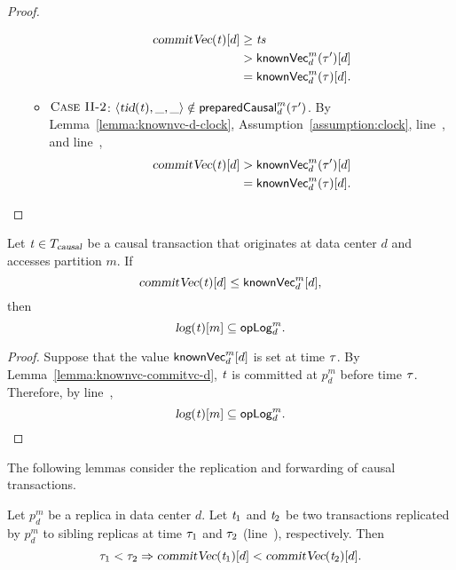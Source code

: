 \begin{proof}
\begin{itemize}
\begin{itemize}
\begin{align*}
            \textsl{commitVec}(\mathit{t})[d] &\ge \mathit{ts} \\
                              &> {\sf knownVec}^{m}_{d}(\tau')[d] \\
                              &= {\sf knownVec}^{m}_{d}(\tau)[d].
          \end{align*}
        \item $\textsc{Case II-2}$:
          $\langle \textsl{tid}(\mathit{t}), \_, \_ \rangle \notin {\sf preparedCausal}^{m}_{d}(\tau')$.
          By Lemma~\ref{lemma:knownvc-d-clock},
          Assumption~\ref{assumption:clock},
          line~\code{\ref{alg:unistore-replica}}{\ref{line:preparecausal-ts}},
          and line~\code{\ref{alg:unistore-coord}}{\ref{line:commitcausal-commitvc-d}},
          \begin{align*}
            \textsl{commitVec}(\mathit{t})[d] &> {\sf knownVec}^{m}_{d}(\tau')[d] \\
                              &= {\sf knownVec}^{m}_{d}(\tau)[d].
          \end{align*}
      \end{itemize}
  \end{itemize}
\end{proof}

\begin{applemma} \label{lemma:knownvc-local-d}
  Let $\mathit{t} \in T_{\textsl{causal}}$ be a causal transaction
  that originates at data center $d$ and accesses partition $m$.
  If
  \[
    \textsl{commitVec}(\mathit{t})[d] \le {\sf knownVec}^{m}_{d}[d],
  \]
  then
  \[
    \textsl{log}(\mathit{t})[m] \subseteq {\sf opLog}^{m}_{d}.
  \]
\end{applemma}

\begin{proof} \label{proof:knownvc-local-d}
  Suppose that the value ${\sf knownVec}^{m}_{d}[d]$ is set at time $\tau$.
  By Lemma~\ref{lemma:knownvc-commitvc-d},
  $\mathit{t}$ is committed at $p^{m}_{d}$ before time $\tau$.
  Therefore, by line~\code{\ref{alg:unistore-replica}}{\ref{line:commit-oplog}},
  \[
    \textsl{log}(\mathit{t})[m] \subseteq {\sf opLog}^{m}_{d}.
  \]
\end{proof}

The following lemmas consider the replication and forwarding
of causal transactions.

\begin{applemma} \label{lemma:replication-order}
  Let $p^{m}_{d}$ be a replica in data center $d$.
  Let $\mathit{t}_{1}$ and $\mathit{t}_{2}$ be two transactions
  replicated by $p^{m}_{d}$ to sibling replicas
  at time $\tau_{1}$ and $\tau_{2}$
  (line~\code{\ref{alg:unistore-replication}}{\ref{line:propagate-call-replicate}}),
  respectively. Then
  \[
    \realtime_{1} < \realtime_{2} \implies \commitVC(\tvar_{1})[d] < \commitVC(\tvar_{2})[d].
  \]
\end{applemma}

